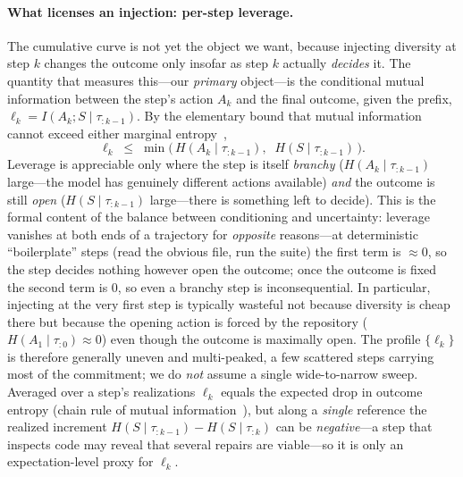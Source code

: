 \documentclass[11pt]{article}
\newcommand{\strat}{S}
\begin{document}
\paragraph{What licenses an injection: per-step leverage.}
The cumulative curve is not yet the object we want, because injecting diversity at
step $k$ changes the outcome only insofar as step $k$ actually \emph{decides} it.
The quantity that measures this---our \emph{primary} object---is the conditional
mutual information between the step's action $A_k$ and the final outcome, given the
prefix, $\ell_k = I(A_k;\strat\mid\tau_{:k-1})$. By the elementary bound that mutual
information cannot exceed either marginal entropy~\citep{cover2006elements},
\begin{equation}
\ell_k \;\le\; \min\big(\,H(A_k\mid\tau_{:k-1}),\;\; H(\strat\mid\tau_{:k-1})\,\big).
\end{equation}
Leverage is appreciable only where the step is itself \emph{branchy}
($H(A_k\mid\tau_{:k-1})$ large---the model has genuinely different actions available)
\emph{and} the outcome is still \emph{open} ($H(\strat\mid\tau_{:k-1})$ large---there
is something left to decide). This is the formal content of the balance between
conditioning and uncertainty: leverage vanishes at both ends of a trajectory for
\emph{opposite} reasons---at deterministic ``boilerplate'' steps (read the obvious
file, run the suite) the first term is $\approx\!0$, so the step decides nothing
however open the outcome; once the outcome is fixed the second term is $0$, so even a
branchy step is inconsequential. In particular, injecting at the very first step is
typically wasteful not because diversity is cheap there but because the opening
action is forced by the repository ($H(A_1\mid\tau_{:0})\!\approx\!0$) even though the
outcome is maximally open. The profile $\{\ell_k\}$ is therefore generally uneven and
multi-peaked, a few scattered steps carrying most of the commitment; we do
\emph{not} assume a single wide-to-narrow sweep. Averaged over a step's
realizations $\ell_k$ equals the expected drop in outcome entropy (chain rule of
mutual information~\citep{cover2006elements}), but along a \emph{single} reference the
realized increment $H(\strat\mid\tau_{:k-1})-H(\strat\mid\tau_{:k})$ can be
\emph{negative}---a step that inspects code may reveal that several repairs are
viable---so it is only an expectation-level proxy for $\ell_k$.
\end{document}
